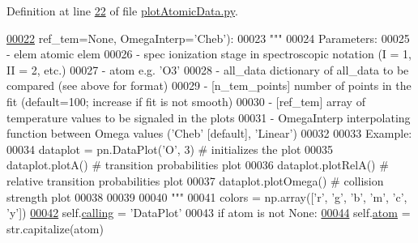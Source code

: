 Definition at line \hyperlink{plot_atomic_data_8py_source_l00022}{22} of file \hyperlink{plot_atomic_data_8py_source}{plot\+Atomic\+Data.\+py}.


\begin{DoxyCode}
\hypertarget{classpyneb_1_1plot_1_1plot_atomic_data_1_1_data_plot_l00022}{}\hyperlink{classpyneb_1_1plot_1_1plot_atomic_data_1_1_data_plot_af4b7b5510131c31e072909a6d20637c3}{00022}                  ref\_tem=\textcolor{keywordtype}{None}, OmegaInterp=\textcolor{stringliteral}{'Cheb'}):
00023         \textcolor{stringliteral}{"""}
00024 \textcolor{stringliteral}{    Parameters:}
00025 \textcolor{stringliteral}{        - elem         atomic elem }
00026 \textcolor{stringliteral}{        - spec       ionization stage in spectroscopic notation (I = 1, II = 2, etc.)}
00027 \textcolor{stringliteral}{        - atom        e.g. 'O3'}
00028 \textcolor{stringliteral}{        - all\_data       dictionary of all\_data to be compared (see above for format)}
00029 \textcolor{stringliteral}{        - [n\_tem\_points] number of points in the fit (default=100; increase if fit is not smooth)}
00030 \textcolor{stringliteral}{        - [ref\_tem]      array of temperature values to be signaled in the plots}
00031 \textcolor{stringliteral}{        - OmegaInterp    interpolating function between Omega values ('Cheb' [default], 'Linear')}
00032 \textcolor{stringliteral}{    }
00033 \textcolor{stringliteral}{    Example:}
00034 \textcolor{stringliteral}{        dataplot = pn.DataPlot('O', 3) # initializes the plot}
00035 \textcolor{stringliteral}{        dataplot.plotA() # transition probabilities plot }
00036 \textcolor{stringliteral}{        dataplot.plotRelA() # relative transition probabilities plot}
00037 \textcolor{stringliteral}{        dataplot.plotOmega() # collision strength plot    }
00038 \textcolor{stringliteral}{}
00039 \textcolor{stringliteral}{        }
00040 \textcolor{stringliteral}{        """}
00041         colors = np.array([\textcolor{stringliteral}{'}\textcolor{stringliteral}{r', '}g', 'b', 'm', 'c', 'y'])
\hypertarget{classpyneb_1_1plot_1_1plot_atomic_data_1_1_data_plot_l00042}{}\hyperlink{classpyneb_1_1plot_1_1plot_atomic_data_1_1_data_plot_a393a133b607541c57d5ebc5a34687e3f}{00042}         self.\hyperlink{classpyneb_1_1plot_1_1plot_atomic_data_1_1_data_plot_a393a133b607541c57d5ebc5a34687e3f}{calling} = \textcolor{stringliteral}{'DataPlot'}
00043         \textcolor{keywordflow}{if} atom \textcolor{keywordflow}{is} \textcolor{keywordflow}{not} \textcolor{keywordtype}{None}:
\hypertarget{classpyneb_1_1plot_1_1plot_atomic_data_1_1_data_plot_l00044}{}\hyperlink{classpyneb_1_1plot_1_1plot_atomic_data_1_1_data_plot_af5bbbf002544d1336f7f673a6e777f2e}{00044}             self.\hyperlink{classpyneb_1_1plot_1_1plot_atomic_data_1_1_data_plot_af5bbbf002544d1336f7f673a6e777f2e}{atom} = str.capitalize(atom)

\end{DoxyCode}
